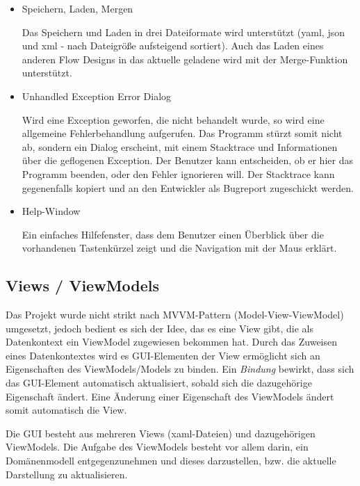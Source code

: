 	\begin{itemize}
		\item Speichern, Laden, Mergen
		
		Das Speichern und Laden in drei Dateiformate wird unterstützt
		(yaml, json und xml - nach Dateigröße aufsteigend sortiert).
		Auch das Laden eines anderen Flow Designs in das aktuelle geladene wird 
		mit der Merge-Funktion unterstützt.

		\item Unhandled Exception Error Dialog
		
		Wird eine Exception geworfen, die nicht behandelt wurde, so wird eine
		allgemeine Fehlerbehandlung aufgerufen. Das Programm stürzt somit nicht ab,
		sondern ein Dialog erscheint, mit einem Stacktrace und Informationen
		über die geflogenen Exception. Der Benutzer kann entscheiden, ob er
		hier das Programm beenden, oder den Fehler ignorieren will.
		Der Stacktrace kann gegenenfalls kopiert und an den Entwickler als
		Bugreport zugeschickt werden.
		
		\item Help-Window
		
		Ein einfaches Hilfefenster, dass dem Benutzer einen Überblick über die
		vorhandenen Tastenkürzel zeigt und die Navigation mit der Maus erklärt.
	\end{itemize}
	



\subsection{Views / ViewModels}

Das Projekt wurde nicht strikt nach MVVM-Pattern (Model-View-ViewModel) 
umgesetzt, jedoch bedient es sich der Idee, das es eine View gibt, die
als Datenkontext ein ViewModel zugewiesen bekommen hat. Durch das Zuweisen eines
Datenkontextes wird es GUI-Elementen der View ermöglicht sich an Eigenschaften des ViewModels/Models zu
binden. Ein \textit{Bindung} bewirkt, dass sich das GUI-Element automatisch aktualisiert,
sobald sich die dazugehörige Eigenschaft ändert. Eine Änderung einer
Eigenschaft des ViewModels ändert somit automatisch die View.

Die GUI besteht aus mehreren Views (xaml-Dateien) und dazugehörigen ViewModels.
Die Aufgabe des ViewModels besteht vor allem darin, ein Domänenmodell entgegenzunehmen und dieses darzustellen, bzw. die aktuelle Darstellung zu aktualisieren.

